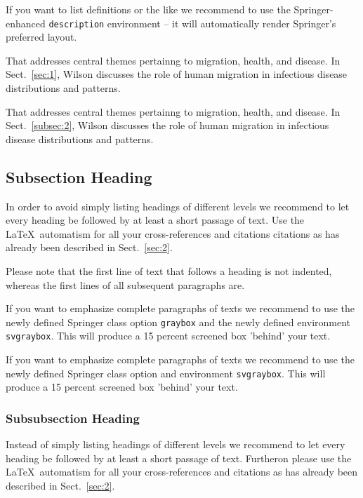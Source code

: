 If you want to list definitions or the like we recommend to use the Springer-enhanced \verb|description| environment -- it will automatically render Springer's preferred layout.

\begin{description}[Type 1]
    \item[Type 1]{That addresses central themes pertainng to migration, health, and disease. In Sect.~\ref{sec:1}, Wilson discusses the role of human migration in infectious disease distributions and patterns.}
    \item[Type 2]{That addresses central themes pertainng to migration, health, and disease. In Sect.~\ref{subsec:2}, Wilson discusses the role of human migration in infectious disease distributions and patterns.}
\end{description}

\subsection{Subsection Heading} %
In order to avoid simply listing headings of different levels we recommend to let every heading be followed by at least a short passage of text. Use the \LaTeX\ automatism for all your cross-references and citations citations as has already been described in Sect.~\ref{sec:2}.

Please note that the first line of text that follows a heading is not indented, whereas the first lines of all subsequent paragraphs are.

\begin{svgraybox}
    If you want to emphasize complete paragraphs of texts we recommend to use the newly defined Springer class option \verb|graybox| and the newly defined environment \verb|svgraybox|. This will produce a 15 percent screened box 'behind' your text.

    If you want to emphasize complete paragraphs of texts we recommend to use the newly defined Springer class option and environment \verb|svgraybox|. This will produce a 15 percent screened box 'behind' your text.
\end{svgraybox}


\subsubsection{Subsubsection Heading}
Instead of simply listing headings of different levels we recommend to let every heading be followed by at least a short passage of text. Furtheron please use the \LaTeX\ automatism for all your cross-references and citations as has already been described in Sect.~\ref{sec:2}.

